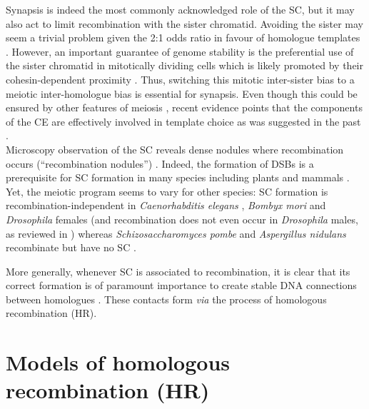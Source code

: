 Synapsis is indeed the most commonly acknowledged role of the SC, but it may also act to limit recombination with the sister chromatid.
Avoiding the sister may seem a trivial problem given the 2:1 odds ratio in favour of homologue templates \citep{lao2010trying}. 
However, an important guarantee of genome stability is the preferential use of the sister chromatid in mitotically dividing cells \citep{kadyk1992sister,bzymek2010double} which is likely promoted by their cohesin-dependent proximity \citep{sjogren2010sphase}.
Thus, switching this mitotic inter-sister bias to a meiotic inter-homologue bias is essential for synapsis.
Even though this could be ensured by other features of meiosis \citep[reviewed in \citealp{humphryes2014non}]{schwacha1997interhomolog, goldfarb2010frequent, hong2013logic}, recent evidence points that the components of the CE are effectively involved in template choice \citep{kim2010sister} as was suggested in the past \citep{haber1998meiosis}.\\

Microscopy observation of the SC reveals dense nodules where recombination occurs (“recombination nodules”) \citep{carpenter1975electron, schmekel1998evidence}.
Indeed, the formation of DSBs is a prerequisite for SC formation in many species including plants and mammals \citep{zickler1999meiotic, henderson2004tying}.
Yet, the meiotic program seems to vary for other species: SC formation is recombination-independent in \textit{Caenorhabditis elegans} \citep{dernburg1998meiotic}, \textit{Bombyx mori} \citep{rasmussen1977transformation} and \textit{Drosophila} females \citep{mckim1998meiotic} (and recombination does not even occur in \textit{Drosophila} males, as reviewed in \citealp{tsai2011homologous}) whereas \textit{Schizosaccharomyces pombe} \citep{bahler1993unusual} and \textit{Aspergillus nidulans} \citep{egel1982meiosis} recombinate but have no SC \citep[reviewed in][]{zickler2015recombination}.

More generally, whenever SC is associated to recombination, it is clear that its correct formation is of paramount importance to create stable DNA connections between homologues \citep[reviewed in \citealp{hunter2003synaptonemal}]{hunter2001singleend}.
These contacts form \textit{via} the process of homologous recombination (HR).






\section{Models of homologous recombination (HR)}

